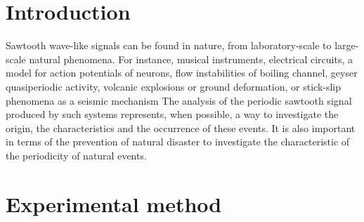\documentclass[aps,pre,preprint,groupedaddress,showkeys]{revtex4-2}
\begin{document}

\maketitle

\section{Introduction}\label{intro}
Sawtooth wave-like signals can be found in nature, from laboratory-scale to large-scale natural phenomena. 
For instance, musical instruments, electrical circuits, a model for action potentials of neurons, flow instabilities of boiling channel, geyser quasiperiodic activity, volcanic explosions or ground deformation, or stick-slip phenomena as a seismic mechanism
The analysis of the periodic sawtooth signal produced by such systems represents, when possible, a way to investigate the origin, the characteristics and the occurrence of these events.
It is also important in terms of the prevention of natural disaster to investigate the characteristic of the periodicity of natural events.



\section{Experimental method}\label{met}
\end{document}

